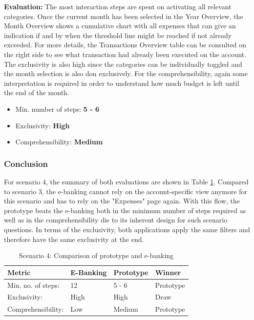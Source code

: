 \textbf{Evaluation:} The most interaction steps are spent on activating all relevant categories. Once the current month has been selected in the Year Overview, the Month Overview shows a cumulative chart with all expenses that can give an indication if and by when the threshold line might be reached if not already exceeded. For more details, the Transactions Overview table can be consulted on the right side to see what transaction had already been executed on the account. The exclusivity is also high since the categories can be individually toggled and the month selection is also don exclusively. For the comprehensibility, again some interpretation is required in order to understand how much budget is left until the end of the month.
\begin{itemize}[noitemsep,nolistsep]
	\item Min. number of steps: \textbf{5 - 6}
	\item Exclusivity: \textbf{High}
	\item Comprehensibility: \textbf{Medium}
\end{itemize}



\subsubsection{Conclusion}

For scenario 4, the summary of both evaluations are shown in Table \ref{tbl:scenariofourcomparison}. Compared to scenario 3, the e-banking cannot rely on the account-specific view anymore for this scenario and has to rely on the "Expenses" page again. With this flow, the prototype beats the e-banking both in the minimum number of steps required as well as in the comprehensibility die to its inherent design for such scenario questions. In terms of the exclusivity, both applications apply the same filters and therefore have the same exclusivity at the end.
\begin{table}[h]
	\begin{center}
		\begin{tabular}{ | p{3.2cm} | p{3.8cm} | p{3.5cm} | p{2.5cm} | }
			\hline
			\textbf{Metric} & \textbf{E-Banking} & \textbf{Prototype} & \textbf{Winner} \\
			\hline
			Min. no. of steps: & 12 & 5 - 6 & Prototype \\
			\hline
			Exclusivity: & High & High & Draw \\
			\hline
			Comprehensibility: & Low & Medium & Prototype \\
			\hline
		\end{tabular}
		\caption{Scenario 4: Comparison of prototype and e-banking}
		\label{tbl:scenariofourcomparison}
	\end{center}
\end{table}



